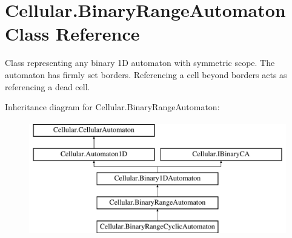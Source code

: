 \hypertarget{class_cellular_1_1_binary_range_automaton}{}\section{Cellular.\+Binary\+Range\+Automaton Class Reference}
\label{class_cellular_1_1_binary_range_automaton}


Class representing any binary 1\+D automaton with symmetric scope. The automaton has firmly set borders. Referencing a cell beyond borders acts as referencing a dead cell.  


Inheritance diagram for Cellular.\+Binary\+Range\+Automaton\+:\begin{figure}[H]
\begin{center}
\leavevmode
\includegraphics[height=5.000000cm]{class_cellular_1_1_binary_range_automaton}
\end{center}
\end{figure}
